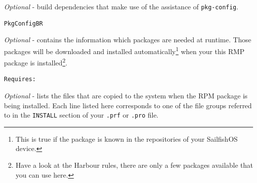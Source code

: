 %
%
\emph{Optional} - build dependencies that make use of the assistance of \verb,pkg-config,\cite{fd01}.
\begin{lstlisting}[language=tex]
PkgConfigBR
\end{lstlisting}
%
%
\emph{Optional} - contains the information which packages are needed at runtime. Those packages will be downloaded and installed automatically\footnote{This is true if the package is known in the repositories of your SailfishOS device.} when your this RMP package is installed\footnote{Have a look at the Harbour rules, there are only a few packages available that you can use here.}.
\begin{lstlisting}[language=tex]
Requires:
\end{lstlisting}
%
%
\emph{Optional} - lists the files that are copied to the system when the RPM package is being installed. Each line listed here corresponds to one of the file groups referred to in the \verb,INSTALL, section of your \verb,.prf, or \verb,.pro, file.

